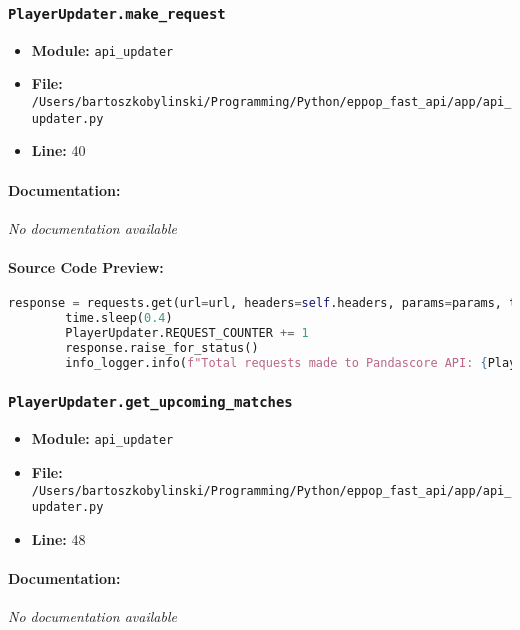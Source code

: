 \documentclass[11pt,a4paper]{article}
\begin{document}
\vspace{1em}
\subsubsection{\texttt{PlayerUpdater.make\_request}}

\begin{itemize}
    \item \textbf{Module:} \texttt{api\_updater}
    \item \textbf{File:} \texttt{/Users/bartoszkobylinski/Programming/Python/eppop\_fast\_api/app/api\_updater.py}
    \item \textbf{Line:} 40
\end{itemize}

\paragraph{Documentation:} \textit{No documentation available}

\paragraph{Source Code Preview:}
\begin{lstlisting}[language=Python]
        response = requests.get(url=url, headers=self.headers, params=params, timeout=10)
        time.sleep(0.4)
        PlayerUpdater.REQUEST_COUNTER += 1
        response.raise_for_status()
        info_logger.info(f"Total requests made to Pandascore API: {PlayerUpdater.REQUEST_COUNTER}. I've hit url: {url}")
\end{lstlisting}

\vspace{1em}
\subsubsection{\texttt{PlayerUpdater.get\_upcoming\_matches}}

\begin{itemize}
    \item \textbf{Module:} \texttt{api\_updater}
    \item \textbf{File:} \texttt{/Users/bartoszkobylinski/Programming/Python/eppop\_fast\_api/app/api\_updater.py}
    \item \textbf{Line:} 48
\end{itemize}

\paragraph{Documentation:} \textit{No documentation available}
\end{document}
